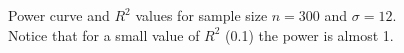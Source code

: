 \documentclass[11pt]{article}
\begin{document}
\begin{figure}[hbtp]
   \centering
       \caption{Power curve and $R^2$ values for sample size $n =300$ and $\sigma = 12$. Notice that for a small value of $R^2$ (0.1) the power is almost 1.}
       \label{fig:power_rsq}
\end{figure}
\end{document}
